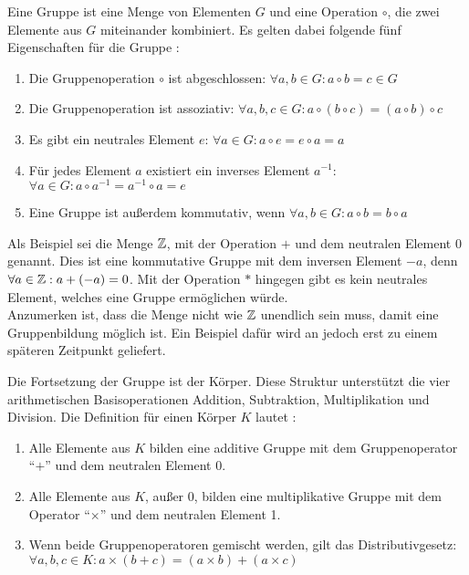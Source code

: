  Eine Gruppe ist eine Menge von Elementen $G$ und eine Operation $\circ$, die zwei Elemente
 aus $G$ miteinander kombiniert. Es gelten dabei folgende fünf Eigenschaften für die Gruppe \cite{paar10}:
 
 \begin{enumerate}
 	\item Die Gruppenoperation $\circ$ ist abgeschlossen: $\forall a, b \in G: a \circ b = c \in G$
	\item Die Gruppenoperation ist assoziativ: $\forall a, b, c \in G: a \circ (b \circ c) = (a \circ b) \circ c$
	\item Es gibt ein neutrales Element $e$: $\forall a \in G: a \circ e = e \circ a = a$
	\item Für jedes Element $a$ existiert ein inverses Element $a^{-1}$: $\forall a \in G: a \circ a^{-1} = a^{-1} \circ a = e$
	\item Eine Gruppe ist außerdem kommutativ, wenn $\forall a, b \in G: a\circ b = b \circ a$
 \end{enumerate}

 Als Beispiel sei die Menge $\mathbb{Z}$, mit der Operation $+$ und dem neutralen Element $0$ genannt.
 Dies ist eine kommutative Gruppe mit dem inversen Element $-a$, denn $\forall a \in \mathbb{Z}: a + (-a) = 0$.
 Mit der Operation $*$ hingegen gibt es kein neutrales Element, welches eine Gruppe ermöglichen
 würde. \\
 Anzumerken ist, dass die Menge nicht wie $\mathbb{Z}$ unendlich sein muss, damit eine Gruppenbildung
 möglich ist. Ein Beispiel dafür wird an jedoch erst zu einem späteren Zeitpunkt geliefert.
 
 Die Fortsetzung der Gruppe ist der Körper. Diese Struktur unterstützt die vier arithmetischen Basisoperationen
 Addition, Subtraktion, Multiplikation und Division. Die Definition für einen Körper $K$ lautet \cite{paar10}:

 \begin{enumerate}
 	\item Alle Elemente aus $K$ bilden eine additive Gruppe mit dem Gruppenoperator ``$+$'' und dem neutralen Element 0.
	\item Alle Elemente aus $K$, außer 0, bilden eine multiplikative Gruppe mit dem Operator ``$\times$'' und dem neutralen Element 1.
	\item Wenn beide Gruppenoperatoren gemischt werden, gilt das Distributivgesetz: \\
		$\forall a, b, c \in K: a \times (b + c) = (a \times b) + (a \times c)$
 \end{enumerate}

